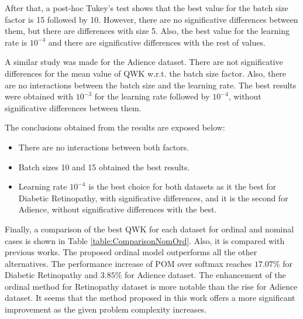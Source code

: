 \documentclass[journal]{IEEEtran}
\begin{document}
	After that, a post-hoc Tukey's test shows that the best value for the batch size factor is 15 followed by 10. However, there are no significative differences between them, but there are differences with size 5. Also, the best value for the learning rate is $10^{-4}$ and there are significative differences with the rest of values.
	
	A similar study was made for the Adience dataset. There are not significative differences for the mean value of QWK w.r.t. the batch size factor. Also, there are no interactions between the batch size and the learning rate. The best results were obtained with $10^{-3}$ for the learning rate followed by $10^{-4}$, without significative differences between them.
	
	The conclusions obtained from the results are exposed below:
	\begin{itemize}
		\item There are no interactions between both factors.
		\item Batch sizes 10 and 15 obtained the best results.
		\item Learning rate $10^{-4}$ is the best choice for both datasets as it the best for Diabetic Retinopathy, with significative differences, and it is the second for Adience, without significative differences with the best. 
	\end{itemize}
	

	Finally, a comparison of the best QWK for each dataset for ordinal and nominal cases is shown in Table \ref{table:ComparisonNomOrd}. Also, it is compared with previous works. The proposed ordinal model outperforms all the other alternatives. The performance increase of POM over softmax reaches $17.07\%$ for Diabetic Retinopathy and $3.85\%$ for Adience dataset. The enhancement of the ordinal method for Retinopathy dataset is more notable than the rise for Adience dataset. It seems that the method proposed in this work offers a more significant improvement as the given problem complexity increases.
	
\end{document}
